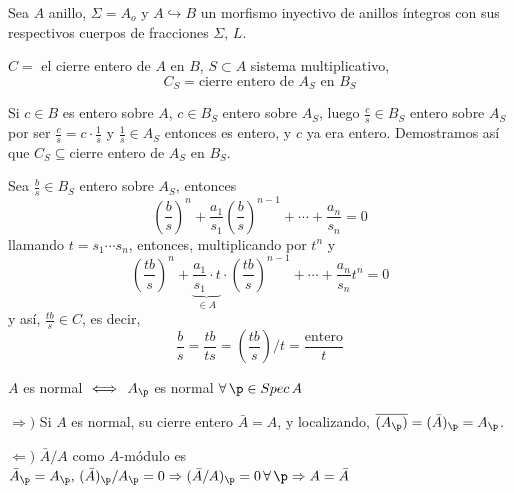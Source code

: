 Sea $A$ anillo, $\Sigma = A_o$ y $A \hookrightarrow B$ un morfismo inyectivo de anillos \'integros con sus respectivos cuerpos de fracciones $\Sigma, \, L$.\begin{teo}
    $C = $ el cierre entero de $A$ en $B$, $S \subset A$ sistema multiplicativo, $$C_S = \text{cierre entero de } A_S \text{ en } B_S$$
\end{teo} 
\begin{dem}
    Si $c\in B$ es entero sobre $A$, $c\in B_S$ entero sobre $A_S$, luego $\frac{c}{s}\in B_S$ entero sobre $A_S$ por ser $\frac{c}{s} =c \cdot \frac{1}{s}$ y $\frac{1}{s} \in A_S$ entonces es entero, y $c$ ya era entero. Demostramos as\'i que $C_S \subseteq$cierre entero de $A_S$ en $B_S$.

    Sea $\frac{b}{s} \in B_S$ entero sobre $A_S$, entonces
    $$\left( \frac{b}{s} \right)^{n} + \frac{a_1}{s_1} \left( \frac{b}{s} \right)^{n-1} + \cdots  + \frac{a_n}{s_n} = 0$$
    llamando $t = s_1\cdots s_n$, entonces, multiplicando por $t^n$ y 
    $$\left( \frac{tb}{s} \right)^{n} + \underbrace{\frac{a_1}{s_1} \cdot t}_{\in A} \cdot \left( \frac{tb}{s} \right)^{n-1} + \cdots  + \frac{a_n}{s_n} t^n = 0$$
    y as\'i, $\frac{tb}{s} \in C$, es decir, 
    $$\frac{b}{s} = \frac{tb}{ts} = \left( \frac{tb}{s} \right) / t = \frac{\text{entero}}{t}$$
\end{dem}
\begin{cor}
    $A$ es normal $\iff \, A_\p$ es normal $\forall \, \p \in Spec\, A$
\end{cor}
\begin{dem}
    $\Rightarrow)$ Si $A$ es normal, su cierre entero $\bar A = A$, y localizando, $\overline{(A_\p)} = (\bar A)_\p = A_\p$.

    $\Leftarrow)$ $\bar A / A$ como $A$-m\'odulo es $\bar A_\p = A_\p, \, (\bar A)_\p / A_\p = 0 \Rightarrow (\bar A / A)_\p = 0 \, \forall \, \p \Rightarrow A=\bar A$
\end{dem}
